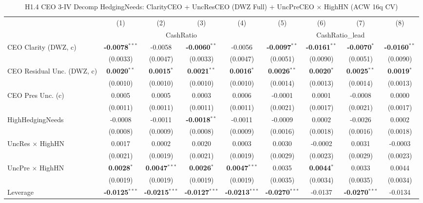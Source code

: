 \documentclass[11pt,a4paper]{article}
\begin{document}
\begin{table}[htbp]
\centering
\caption{H1.4 CEO 3-IV Decomp HedgingNeeds: ClarityCEO + UncResCEO (DWZ Full) + UncPreCEO $\times$ HighHN (ACW 16q CV)}
\label{tab:h1_4_hedging_needs}
\scriptsize
\begin{tabular}{lcccccccc}
\toprule
 & (1) & (2) & (3) & (4) & (5) & (6) & (7) & (8) \\
 & \multicolumn{4}{c}{CashRatio} & \multicolumn{4}{c}{CashRatio\_lead} \\
\cmidrule(lr){2-5} \cmidrule(lr){6-9}
\midrule
CEO Clarity (DWZ, c) & \textbf{-0.0078}$^{***}$ & -0.0058 & \textbf{-0.0060}$^{**}$ & -0.0056 & \textbf{-0.0097}$^{**}$ & \textbf{-0.0161}$^{**}$ & \textbf{-0.0070}$^{*}$ & \textbf{-0.0160}$^{**}$ \\
 & (0.0033) & (0.0047) & (0.0033) & (0.0047) & (0.0051) & (0.0090) & (0.0051) & (0.0090) \\
CEO Residual Unc. (DWZ, c) & \textbf{0.0020}$^{**}$ & \textbf{0.0015}$^{*}$ & \textbf{0.0021}$^{**}$ & \textbf{0.0016}$^{*}$ & \textbf{0.0026}$^{**}$ & \textbf{0.0020}$^{*}$ & \textbf{0.0025}$^{**}$ & \textbf{0.0019}$^{*}$ \\
 & (0.0010) & (0.0010) & (0.0010) & (0.0010) & (0.0014) & (0.0013) & (0.0014) & (0.0013) \\
CEO Pres Unc. (c) & 0.0005 & 0.0005 & 0.0003 & 0.0006 & -0.0001 & 0.0001 & -0.0008 & 0.0000 \\
 & (0.0011) & (0.0011) & (0.0011) & (0.0011) & (0.0021) & (0.0017) & (0.0021) & (0.0017) \\
HighHedgingNeeds & -0.0008 & -0.0011 & \textbf{-0.0018}$^{**}$ & -0.0011 & -0.0009 & 0.0002 & -0.0026 & 0.0002 \\
 & (0.0008) & (0.0009) & (0.0008) & (0.0009) & (0.0016) & (0.0018) & (0.0016) & (0.0018) \\
UncRes $\times$ HighHN & 0.0017 & 0.0002 & 0.0020 & 0.0003 & 0.0030 & -0.0002 & 0.0031 & -0.0003 \\
 & (0.0021) & (0.0019) & (0.0021) & (0.0019) & (0.0029) & (0.0023) & (0.0029) & (0.0023) \\
UncPre $\times$ HighHN & \textbf{0.0028}$^{*}$ & \textbf{0.0047}$^{***}$ & \textbf{0.0026}$^{*}$ & \textbf{0.0047}$^{***}$ & 0.0035 & \textbf{0.0044}$^{*}$ & 0.0033 & 0.0044 \\
 & (0.0019) & (0.0019) & (0.0019) & (0.0019) & (0.0035) & (0.0034) & (0.0035) & (0.0034) \\
\midrule
Leverage & \textbf{-0.0125}$^{***}$ & \textbf{-0.0215}$^{***}$ & \textbf{-0.0127}$^{***}$ & \textbf{-0.0213}$^{***}$ & \textbf{-0.0270}$^{***}$ & -0.0137 & \textbf{-0.0270}$^{***}$ & -0.0134 \\

\end{tabular}
\end{table}
\end{document}
